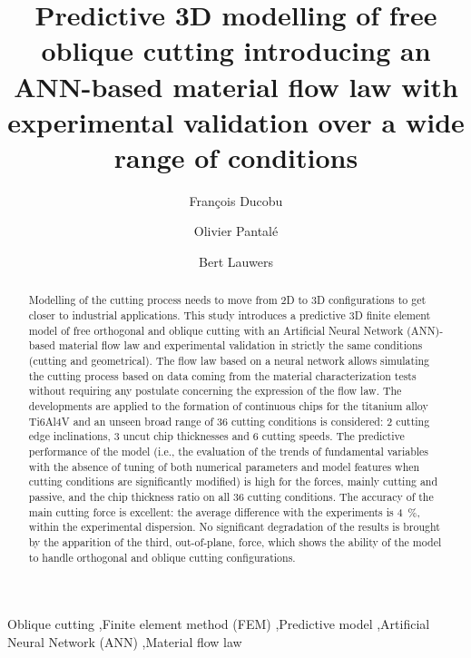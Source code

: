 \documentclass[preprint,12pt,times]{elsarticle}
\begin{document}
\begin{frontmatter}

\title{Predictive 3D modelling of free oblique cutting introducing an ANN-based material flow law with experimental validation over a wide range of conditions}

\author[1]{François Ducobu}

\author[2]{Olivier Pantal\'{e}}
\author[3]{Bert Lauwers}

\address[1]{Machine Design and Production Engineering Lab, Research Institute for Science and Material Engineering, UMONS, Belgium}
\address[2]{Laboratoire G\'{e}nie de Production, INP/ENIT, Universit\'{e} de Toulouse, Tarbes, France}
\address[3]{Department of Mechanical Engineering, KU Leuven \& Flanders Make@KU Leuven-MaPS, Belgium}

\begin{abstract}

Modelling of the cutting process needs to move from 2D to 3D configurations to get closer to industrial applications. This study introduces a predictive 3D finite element model of free orthogonal and oblique cutting with an Artificial Neural Network (ANN)-based material flow law and experimental validation in strictly the same conditions (cutting and geometrical). The flow law based on a neural network allows simulating the cutting process based on data coming from the material characterization tests without requiring any postulate concerning the expression of the flow law. The developments are applied to the formation of continuous chips for the titanium alloy Ti6Al4V and an unseen broad range of 36 cutting conditions is considered: 2 cutting edge inclinations, 3 uncut chip thicknesses and 6 cutting speeds. The predictive performance of the model (i.e., the evaluation of the trends of fundamental variables with the absence of tuning of both numerical parameters and model features when cutting conditions are significantly modified) is high for the forces, mainly cutting and passive, and the chip thickness ratio on all 36 cutting conditions. The accuracy of the main cutting force is excellent: the average difference with the experiments is \qty{4}{\%}, within the experimental dispersion. No significant degradation of the results is brought by the apparition of the third, out-of-plane, force, which shows the ability of the model to handle orthogonal and oblique cutting configurations.

\end{abstract}

\begin{keyword}

Oblique cutting \sep Finite element method (FEM) \sep Predictive model \sep Artificial Neural Network (ANN) \sep Material flow law

\end{keyword}

\end{frontmatter}
\end{document}

